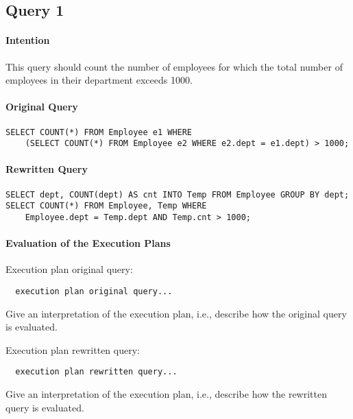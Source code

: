 \documentclass[11pt]{scrartcl}
\begin{document}
\subsection*{Query 1}

\paragraph{Intention}

This query should count the number of employees for which the total
number of employees in their department exceeds 1000.

\paragraph{Original Query}

{\small
\begin{verbatim}
SELECT COUNT(*) FROM Employee e1 WHERE
    (SELECT COUNT(*) FROM Employee e2 WHERE e2.dept = e1.dept) > 1000;
\end{verbatim}
}

\paragraph{Rewritten Query}

{\small
\begin{verbatim}
SELECT dept, COUNT(dept) AS cnt INTO Temp FROM Employee GROUP BY dept;
SELECT COUNT(*) FROM Employee, Temp WHERE
    Employee.dept = Temp.dept AND Temp.cnt > 1000;
\end{verbatim}
}

\paragraph{Evaluation of the Execution Plans}

Execution plan original query:

\begin{verbatim}
  execution plan original query...
\end{verbatim}

Give an interpretation of the execution plan, i.e., describe how the
original query is evaluated.

Execution plan rewritten query:

\begin{verbatim}
  execution plan rewritten query...
\end{verbatim}

Give an interpretation of the execution plan, i.e., describe how the
rewritten query is evaluated.
\end{document}
